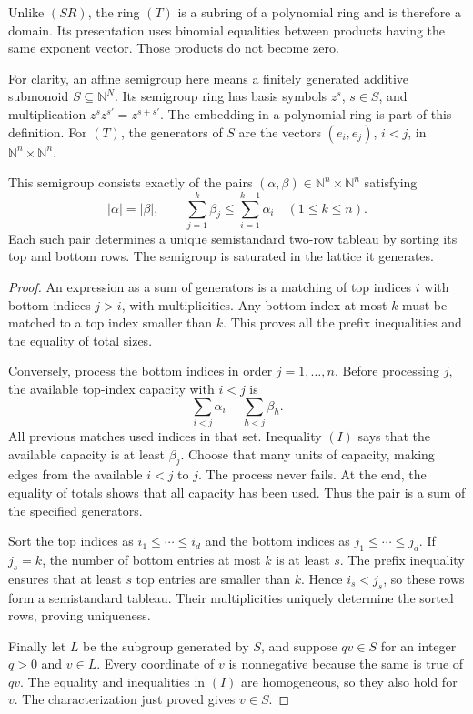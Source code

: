 Unlike \((SR)\), the ring
\((T)\) is a subring of a
polynomial ring and is
therefore a domain.  Its
presentation uses binomial
equalities between products
having the same exponent
vector.  Those products do
not become zero.

For clarity, an affine
semigroup here means a
finitely generated additive
submonoid \(S\subseteq
\mathbb N^N\).  Its
semigroup ring has basis
symbols \(z^s\), \(s\in S\),
and multiplication
\(z^s z^{s'}=z^{s+s'}\).
The embedding in a
polynomial ring is part
of this definition.
For \((T)\), the generators
of \(S\) are the vectors
\((e_i,e_j)\), \(i<j\),
in \(\mathbb N^n\times
\mathbb N^n\).

\begin{theorem}
This semigroup consists exactly of the pairs
\((\alpha,\beta)\in\mathbb N^n\times\mathbb N^n\)
satisfying
\[
 |\alpha|=|\beta|,\qquad
 \sum_{j=1}^k\beta_j
       \le\sum_{i=1}^{k-1}\alpha_i
       \quad(1\le k\le n).
 \tag{I}
\]
Each such pair determines a unique
semistandard two-row tableau by
sorting its top and bottom rows.
The semigroup is saturated in
the lattice it generates.
\end{theorem}
\begin{proof}
An expression as a sum of
generators is a matching of
top indices \(i\) with
bottom indices \(j>i\),
with multiplicities.  Any
bottom index at most \(k\)
must be matched to a top
index smaller than \(k\).
This proves all the prefix
inequalities and the equality
of total sizes.

Conversely, process the bottom
indices in order \(j=1,\ldots,n\).
Before processing \(j\),
the available top-index
capacity with \(i<j\) is
\[
 \sum_{i<j}\alpha_i-\sum_{h<j}\beta_h.
 \]
All previous matches used
indices in that set.
Inequality \((I)\) says
that the available capacity
is at least \(\beta_j\).
Choose that many units of
capacity, making edges
from the available \(i<j\)
to \(j\).  The process
never fails.  At the end,
the equality of totals
shows that all capacity
has been used.  Thus the
pair is a sum of the
specified generators.

Sort the top indices as
\(i_1\le\cdots\le i_d\)
and the bottom indices
as \(j_1\le\cdots\le j_d\).
If \(j_s=k\), the number
of bottom entries at
most \(k\) is at least
\(s\).  The prefix
inequality ensures that
at least \(s\) top
entries are smaller
than \(k\).  Hence
\(i_s<j_s\), so these
rows form a semistandard
tableau.  Their
multiplicities uniquely
determine the sorted
rows, proving uniqueness.

Finally let \(L\) be
the subgroup generated
by \(S\), and suppose
\(qv\in S\) for an
integer \(q>0\) and
\(v\in L\).  Every
coordinate of \(v\)
is nonnegative because
the same is true of
\(qv\).  The equality
and inequalities in
\((I)\) are homogeneous,
so they also hold for
\(v\).  The characterization
just proved gives
\(v\in S\).
\end{proof}

